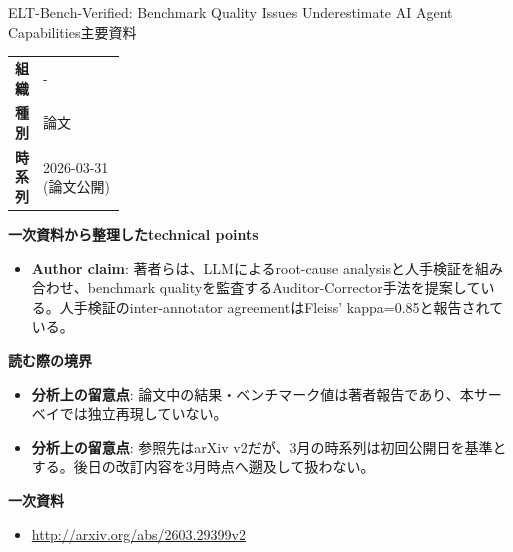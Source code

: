 \begin{technicalnote}{ELT-Bench-Verified: Benchmark Quality Issues Underestimate AI Agent Capabilities}{主要資料}
\begingroup
\begin{tabularx}{\linewidth}{@{}>{\bfseries}p{0.22\linewidth}X@{}}
組織 & - \\
種別 & 論文 \\
時系列 & 2026-03-31 (論文公開) \\
\end{tabularx}
\smallskip
{\bfseries 一次資料から整理したtechnical points}
\begin{itemize}[leftmargin=1.5em,itemsep=0.35em]
\item \textbf{Author claim}: 著者らは、LLMによるroot-cause analysisと人手検証を組み合わせ、benchmark qualityを監査するAuditor-Corrector手法を提案している。人手検証のinter-annotator agreementはFleiss' kappa=0.85と報告されている。
\end{itemize}
\begin{minipage}{\linewidth}
{\bfseries 読む際の境界}
\begin{itemize}[leftmargin=1.5em,itemsep=0.35em]
\item \textbf{分析上の留意点}: 論文中の結果・ベンチマーク値は著者報告であり、本サーベイでは独立再現していない。
\item \textbf{分析上の留意点}: 参照先はarXiv v2だが、3月の時系列は初回公開日を基準とする。後日の改訂内容を3月時点へ遡及して扱わない。
\end{itemize}
\begin{samepage}
{\bfseries 一次資料}
\begingroup\sloppy
\begin{itemize}[leftmargin=1.5em,itemsep=0.25em]
\item {\scriptsize\url{http://arxiv.org/abs/2603.29399v2}}
\end{itemize}
\endgroup
\end{samepage}
\end{minipage}
\endgroup
\end{technicalnote}
\medskip
